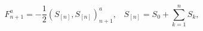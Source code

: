 \begin{equation*}
F_{n+1}^{a}=-\frac{1}{2}(S_{[n]},S_{[n]})_{n+1}^{a},\;\;\;S_{[n]}=S_{0}+%
\sum_{k=1}^{n}S_{k},
\end{equation*}

